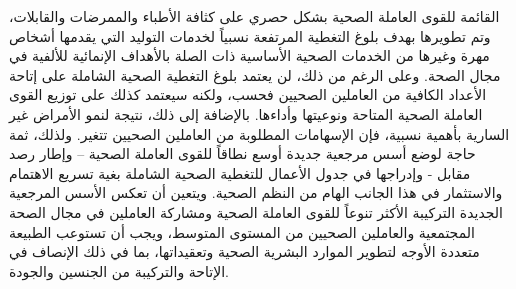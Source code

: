 \documentclass{article}
\begin{document}
القائمة للقوى
العاملة
الصحية بشكل
حصري على كثافة
الأطباء
والممرضات
والقابلات،
وتم تطويرها
بهدف بلوغ
التغطية
المرتفعة
نسبياً لخدمات
التوليد التي
يقدمها أشخاص
مهرة وغيرها من
الخدمات
الصحية
الأساسية ذات
الصلة
بالأهداف
الإنمائية
للألفية في
مجال الصحة.
وعلى الرغم من
ذلك، لن يعتمد
بلوغ التغطية
الصحية
الشاملة على
إتاحة الأعداد
الكافية من
العاملين
الصحيين فحسب،
ولكنه سيعتمد
كذلك على توزيع
القوى العاملة
الصحية
المتاحة
ونوعيتها
وأداءها.
بالإضافة إلى
ذلك، نتيجة
لنمو الأمراض
غير السارية
بأهمية نسبية،
فإن الإسهامات
المطلوبة من
العاملين
الصحيين تتغير.
ولذلك، ثمة
حاجة لوضع أسس
مرجعية جديدة
أوسع نطاقاً
للقوى العاملة
الصحية – وإطار
رصد مقابل -
وإدراجها في
جدول الأعمال
للتغطية
الصحية
الشاملة بغية
تسريع
الاهتمام
والاستثمار في
هذا الجانب
الهام من النظم
الصحية. ويتعين
أن تعكس الأسس
المرجعية
الجديدة
التركيبة
الأكثر تنوعاً
للقوى العاملة
الصحية
ومشاركة
العاملين في
مجال الصحة
المجتمعية
والعاملين
الصحيين من
المستوى
المتوسط، ويجب
أن تستوعب
الطبيعة
متعددة الأوجه
لتطوير
الموارد
البشرية
الصحية
وتعقيداتها،
بما في ذلك
الإنصاف في
الإتاحة
والتركيبة من
الجنسين
والجودة.
\end{document}
